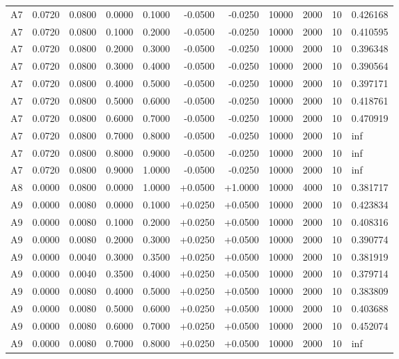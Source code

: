 \documentclass{article}
\begin{document}
\begin{longtable}{l r r r r r r r r r l}
A7 & 0.0720 & 0.0800 & 0.0000 & 0.1000 & -0.0500 & -0.0250 & 10000 & 2000 & 10 & 0.426168 \\
A7 & 0.0720 & 0.0800 & 0.1000 & 0.2000 & -0.0500 & -0.0250 & 10000 & 2000 & 10 & 0.410595 \\
A7 & 0.0720 & 0.0800 & 0.2000 & 0.3000 & -0.0500 & -0.0250 & 10000 & 2000 & 10 & 0.396348 \\
A7 & 0.0720 & 0.0800 & 0.3000 & 0.4000 & -0.0500 & -0.0250 & 10000 & 2000 & 10 & 0.390564 \\
A7 & 0.0720 & 0.0800 & 0.4000 & 0.5000 & -0.0500 & -0.0250 & 10000 & 2000 & 10 & 0.397171 \\
A7 & 0.0720 & 0.0800 & 0.5000 & 0.6000 & -0.0500 & -0.0250 & 10000 & 2000 & 10 & 0.418761 \\
A7 & 0.0720 & 0.0800 & 0.6000 & 0.7000 & -0.0500 & -0.0250 & 10000 & 2000 & 10 & 0.470919 \\
A7 & 0.0720 & 0.0800 & 0.7000 & 0.8000 & -0.0500 & -0.0250 & 10000 & 2000 & 10 & inf \\
A7 & 0.0720 & 0.0800 & 0.8000 & 0.9000 & -0.0500 & -0.0250 & 10000 & 2000 & 10 & inf \\
A7 & 0.0720 & 0.0800 & 0.9000 & 1.0000 & -0.0500 & -0.0250 & 10000 & 2000 & 10 & inf \\
A8 & 0.0000 & 0.0800 & 0.0000 & 1.0000 & +0.0500 & +1.0000 & 10000 & 4000 & 10 & 0.381717 \\
A9 & 0.0000 & 0.0080 & 0.0000 & 0.1000 & +0.0250 & +0.0500 & 10000 & 2000 & 10 & 0.423834 \\
A9 & 0.0000 & 0.0080 & 0.1000 & 0.2000 & +0.0250 & +0.0500 & 10000 & 2000 & 10 & 0.408316 \\
A9 & 0.0000 & 0.0080 & 0.2000 & 0.3000 & +0.0250 & +0.0500 & 10000 & 2000 & 10 & 0.390774 \\
A9 & 0.0000 & 0.0040 & 0.3000 & 0.3500 & +0.0250 & +0.0500 & 10000 & 2000 & 10 & 0.381919 \\
A9 & 0.0000 & 0.0040 & 0.3500 & 0.4000 & +0.0250 & +0.0500 & 10000 & 2000 & 10 & 0.379714 \\
A9 & 0.0000 & 0.0080 & 0.4000 & 0.5000 & +0.0250 & +0.0500 & 10000 & 2000 & 10 & 0.383809 \\
A9 & 0.0000 & 0.0080 & 0.5000 & 0.6000 & +0.0250 & +0.0500 & 10000 & 2000 & 10 & 0.403688 \\
A9 & 0.0000 & 0.0080 & 0.6000 & 0.7000 & +0.0250 & +0.0500 & 10000 & 2000 & 10 & 0.452074 \\
A9 & 0.0000 & 0.0080 & 0.7000 & 0.8000 & +0.0250 & +0.0500 & 10000 & 2000 & 10 & inf \\

\end{longtable}
\end{document}
